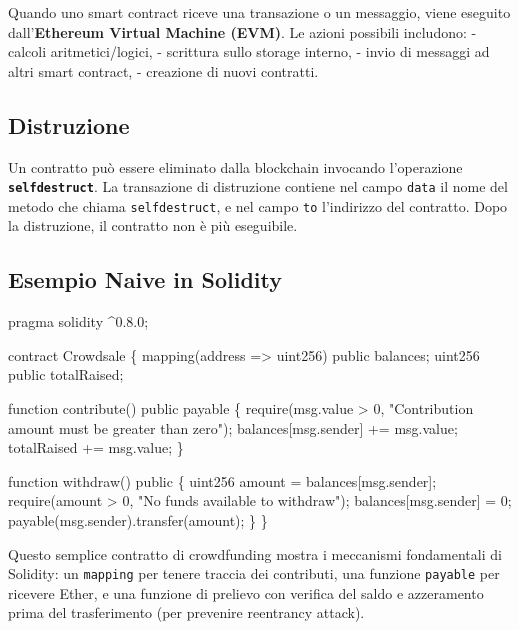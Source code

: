 \documentclass[
  italian,
  openany]{book}
\newenvironment{Shaded}{\begin{snugshade}}{\end{snugshade}}
\newcommand{\NormalTok}[1]{#1}
\begin{document}
Quando uno smart contract riceve una transazione o un messaggio, viene
eseguito dall'\textbf{Ethereum Virtual Machine (EVM)}. Le azioni
possibili includono: - calcoli aritmetici/logici, - scrittura sullo
storage interno, - invio di messaggi ad altri smart contract, -
creazione di nuovi contratti.

\subsection{Distruzione}\label{distruzione}

Un contratto può essere eliminato dalla blockchain invocando
l'operazione \textbf{\texttt{selfdestruct}}. La transazione di
distruzione contiene nel campo \texttt{data} il nome del metodo che
chiama \texttt{selfdestruct}, e nel campo \texttt{to} l'indirizzo del
contratto. Dopo la distruzione, il contratto non è più eseguibile.

\subsection{Esempio Naive in Solidity}\label{esempio-naive-in-solidity}

\begin{Shaded}
\begin{Highlighting}[]
\NormalTok{pragma solidity \^{}0.8.0;}

\NormalTok{contract Crowdsale \{}
\NormalTok{    mapping(address =\textgreater{} uint256) public balances;}
\NormalTok{    uint256 public totalRaised;}

\NormalTok{    function contribute() public payable \{}
\NormalTok{        require(msg.value \textgreater{} 0, "Contribution amount must be greater than zero");}
\NormalTok{        balances[msg.sender] += msg.value;}
\NormalTok{        totalRaised += msg.value;}
\NormalTok{    \}}

\NormalTok{    function withdraw() public \{}
\NormalTok{        uint256 amount = balances[msg.sender];}
\NormalTok{        require(amount \textgreater{} 0, "No funds available to withdraw");}
\NormalTok{        balances[msg.sender] = 0;}
\NormalTok{        payable(msg.sender).transfer(amount);}
\NormalTok{    \}}
\NormalTok{\}}
\end{Highlighting}
\end{Shaded}

Questo semplice contratto di crowdfunding mostra i meccanismi
fondamentali di Solidity: un \texttt{mapping} per tenere traccia dei
contributi, una funzione \texttt{payable} per ricevere Ether, e una
funzione di prelievo con verifica del saldo e azzeramento prima del
trasferimento (per prevenire reentrancy attack).
\end{document}
